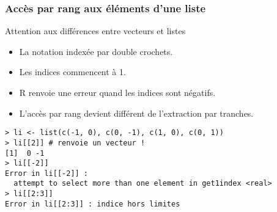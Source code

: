 \documentclass[10pt]{beamer}
\begin{document}
\begin{frame}[fragile]
  \frametitle{Accès par rang aux éléments d'une liste}
  \begin{alertblock}{Attention aux différences entre vecteurs et listes }
  \begin{itemize}
  \item La notation indexée par \alert{double crochets}. 
  \item Les indices commencent à 1.
  \item R renvoie une erreur quand les indices sont négatifs.
  \item L'accès par rang devient différent de l'extraction par tranches.
  \end{itemize}
  \end{alertblock}
  
  \begin{lstlisting}
> li <- list(c(-1, 0), c(0, -1), c(1, 0), c(0, 1)) 
> li[[2]] # renvoie un vecteur !
[1]  0 -1
> li[[-2]] 
Error in li[[-2]] : 
  attempt to select more than one element in get1index <real>
> li[[2:3]] 
Error in li[[2:3]] : indice hors limites
\end{lstlisting}
\end{frame}
\end{document}
